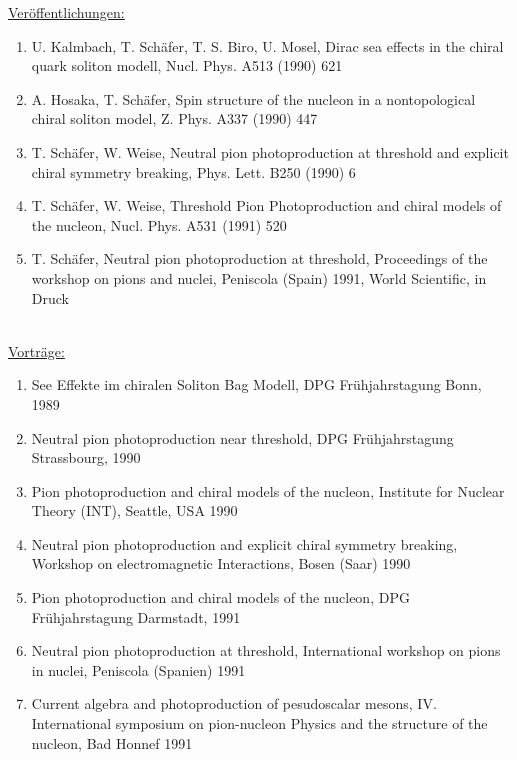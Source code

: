 \newpage
\underline{Ver\"offentlichungen:}
\begin{enumerate}
\item{U. Kalmbach, T. Sch\"afer, T. S. Biro, U. Mosel,  Dirac sea effects in
the chiral quark soliton modell, Nucl. Phys. A513 (1990) 621 }
\item{A. Hosaka, T. Sch\"afer, Spin structure of the nucleon in a
 nontopological chiral soliton model, Z. Phys. A337 (1990) 447}
\item{T. Sch\"afer, W. Weise, Neutral pion photoproduction at threshold and
explicit chiral symmetry breaking, Phys. Lett. B250 (1990) 6 }
\item{T. Sch\"afer, W. Weise, Threshold Pion Photoproduction and chiral
models of the nucleon, Nucl. Phys. A531 (1991) 520}
\item{T. Sch\"afer, Neutral pion photoproduction at threshold, Proceedings
of the workshop on pions and nuclei, Peniscola (Spain) 1991, World
Scientific, in Druck} 
\end{enumerate}
\\

\underline{Vortr\"age:}
\begin{enumerate}
\item{See Effekte im chiralen
Soliton Bag Modell, DPG Fr\"uhjahrstagung Bonn, 1989 }
\item{Neutral pion photoproduction near threshold,
DPG Fr\"uhjahrstagung Strassbourg, 1990 }
\item{Pion photoproduction and chiral models of the 
nucleon, Institute for Nuclear Theory (INT), Seattle, USA 1990} 
\item{Neutral pion photoproduction and explicit chiral
symmetry breaking, Workshop on electromagnetic Interactions, Bosen (Saar) 1990}
\item{Pion photoproduction and chiral models
of the nucleon, DPG Fr\"uhjahrstagung Darmstadt, 1991}
\item{Neutral pion photoproduction at threshold,
International workshop on pions in nuclei, Peniscola (Spanien) 1991}
\item{Current algebra and photoproduction of 
pesudoscalar mesons, IV. International symposium on pion-nucleon Physics
and the structure of the nucleon, Bad Honnef 1991 }
\end{enumerate}     
     